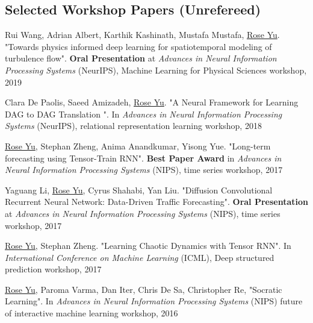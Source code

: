 \documentclass[margin,line]{res}
\begin{document}
\begin{resume}
\section{\sc Selected
Workshop
Papers
(Unrefereed) }
\begin{enumerate}[label={[W\arabic*]}]
\item Rui Wang, Adrian Albert, Karthik Kashinath, Mustafa Mustafa, \underline{Rose Yu}. "Towards physics informed deep learning for spatiotemporal modeling of turbulence flow". \textbf{Oral Presentation} at \textit{Advances in Neural Information Processing Systems} (NeurIPS), Machine Learning for Physical Sciences  workshop, 2019

\item Clara De Paolis, Saeed Amizadeh, \underline{Rose Yu}.  "A Neural Framework for Learning DAG to DAG Translation ". In  \textit{Advances in Neural Information Processing Systems} (NeurIPS), relational representation learning workshop, 2018

\item \underline{Rose Yu}, Stephan Zheng, Anima Anandkumar, Yisong Yue. "Long-term forecasting using Tensor-Train RNN". \textbf{Best Paper Award}  in \textit{Advances in Neural Information Processing Systems} (NIPS), time series workshop, 2017


\item Yaguang Li, \underline{Rose Yu}, Cyrus Shahabi, Yan Liu. "Diffusion Convolutional Recurrent Neural Network: Data-Driven Traffic Forecasting". \textbf{Oral Presentation} at \textit{Advances in Neural Information Processing Systems} (NIPS), time series workshop, 2017


\item \underline{Rose Yu}, Stephan Zheng. "Learning Chaotic Dynamics with Tensor RNN". In  \textit{International Conference on Machine Learning} (ICML), Deep structured prediction workshop, 2017

\item \underline{Rose Yu},  Paroma Varma, Dan Iter, Chris De Sa, Christopher Re,  "Socratic Learning".  In \textit{Advances in Neural Information Processing Systems}  (NIPS) future of interactive machine learning workshop, 2016

%
%
%
\end{enumerate}



\end{resume}
\end{document}
